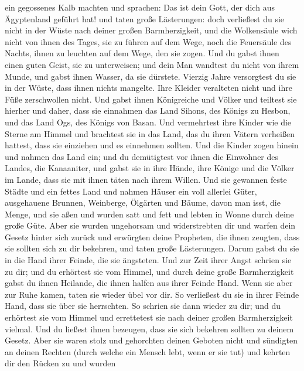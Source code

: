 ein gegossenes Kalb machten und sprachen: Das ist dein Gott, der dich
aus Ägyptenland geführt hat! und taten große Lästerungen:
 doch verließest du sie nicht in der Wüste nach deiner
großen Barmherzigkeit, und die Wolkensäule wich nicht von ihnen des
Tages, sie zu führen auf dem Wege, noch die Feuersäule des Nachts, ihnen
zu leuchten auf dem Wege, den sie zogen.  Und du gabst
ihnen einen guten Geist, sie zu unterweisen; und dein Man wandtest du
nicht von ihrem Munde, und gabst ihnen Wasser, da sie dürstete.
 Vierzig Jahre versorgtest du sie in der Wüste, dass
ihnen nichts mangelte. Ihre Kleider veralteten nicht und ihre Füße
zerschwollen nicht.  Und gabst ihnen Königreiche und
Völker und teiltest sie hierher und daher, dass sie einnahmen das Land
Sihons, des Königs zu Hesbon, und das Land Ogs, des Königs von Basan.
 Und vermehrtest ihre Kinder wie die Sterne am Himmel und
brachtest sie in das Land, das du ihren Vätern verheißen hattest, dass
sie einziehen und es einnehmen sollten.  Und die Kinder
zogen hinein und nahmen das Land ein; und du demütigtest vor ihnen die
Einwohner des Landes, die Kanaaniter, und gabst sie in ihre Hände, ihre
Könige und die Völker im Lande, dass sie mit ihnen täten nach ihrem
Willen.  Und sie gewannen feste Städte und ein fettes
Land und nahmen Häuser ein voll allerlei Güter, ausgehauene Brunnen,
Weinberge, Ölgärten und Bäume, davon man isst, die Menge, und sie aßen
und wurden satt und fett und lebten in Wonne durch deine große Güte.
 Aber sie wurden ungehorsam und widerstrebten dir und
warfen dein Gesetz hinter sich zurück und erwürgten deine Propheten, die
ihnen zeugten, dass sie sollten sich zu dir bekehren, und taten große
Lästerungen.  Darum gabst du sie in die Hand ihrer
Feinde, die sie ängsteten. Und zur Zeit ihrer Angst schrien sie zu dir;
und du erhörtest sie vom Himmel, und durch deine große Barmherzigkeit
gabst du ihnen Heilande, die ihnen halfen aus ihrer Feinde Hand.
 Wenn sie aber zur Ruhe kamen, taten sie wieder übel vor
dir. So verließest du sie in ihrer Feinde Hand, dass sie über sie
herrschten. So schrien sie dann wieder zu dir; und du erhörtest sie vom
Himmel und errettetest sie nach deiner großen Barmherzigkeit vielmal.
 Und du ließest ihnen bezeugen, dass sie sich bekehren
sollten zu deinem Gesetz. Aber sie waren stolz und gehorchten deinen
Geboten nicht und sündigten an deinen Rechten (durch welche ein Mensch
lebt, wenn er sie tut) und kehrten dir den Rücken zu und wurden
